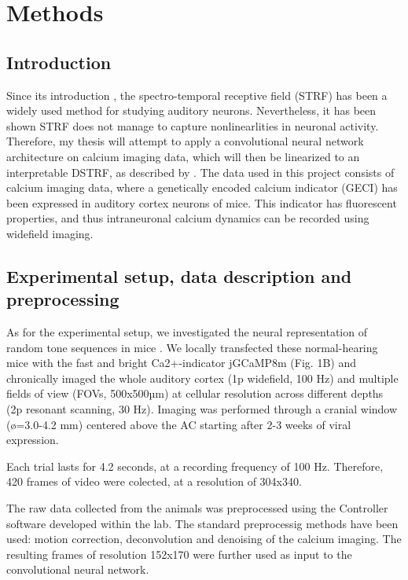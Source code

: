 \chapter{Methods}\label{methods}

\section{Introduction}
Since its introduction \parencite{aertsenSpectrotemporalReceptiveFields1980a}, the spectro-temporal receptive field (STRF) has been a widely used method for studying auditory neurons. Nevertheless, it has been shown STRF does not manage to capture nonlinearlities in neuronal activity. Therefore, my thesis will attempt to apply a convolutional neural network architecture on calcium imaging data, which will then be linearized to an interpretable DSTRF, as described by \textcite{keshishianEstimatingInterpretingNonlinear2020}. 
The data used in this project consists of calcium imaging data, where a genetically encoded calcium indicator (GECI) has been expressed in auditory cortex neurons of mice. This indicator has fluorescent properties, and thus intraneuronal calcium dynamics can be recorded using widefield imaging.

\section{Experimental setup, data description and preprocessing}
As for the experimental setup, we investigated the neural representation of random tone sequences in mice . We locally transfected these normal-hearing mice with the fast and bright Ca2+-indicator jGCaMP8m (Fig. 1B) and chronically imaged the whole auditory cortex (1p widefield, 100 Hz) and multiple fields of view (FOVs, 500x500µm) at cellular resolution across different depths (2p resonant scanning, 30 Hz). Imaging was performed through a cranial window (ø=3.0-4.2 mm) centered above the AC starting after 2-3 weeks of viral expression.

Each trial lasts for 4.2 seconds, at a recording frequency of 100 Hz. Therefore, 420 frames of video were colected, at a resolution of 304x340.

The raw data collected from the animals was preprocessed using the Controller software developed within the lab. The standard preprocessig methods have been used: motion correction, deconvolution and denoising of the calcium imaging. The resulting frames of resolution 152x170 were further used as input to the convolutional neural network.

